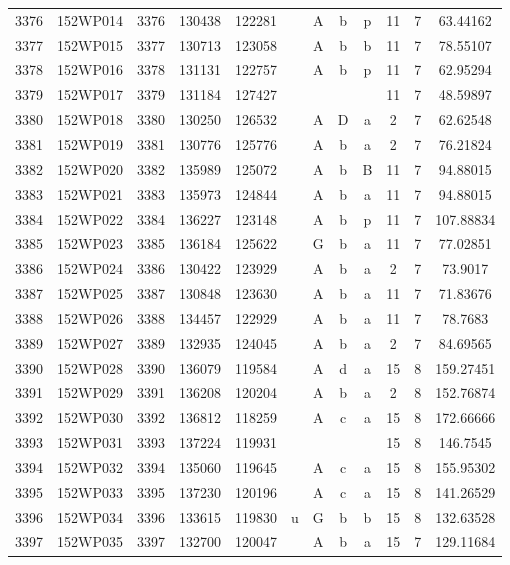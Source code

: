 \begin{tabular}{|*{12}{c|}}
3376 & 152WP014 & 3376 & 130438 & 122281 &  & A & b & p & 11 & 7 & 63.44162 \\ 
3377 & 152WP015 & 3377 & 130713 & 123058 &  & A & b & b & 11 & 7 & 78.55107 \\ 
3378 & 152WP016 & 3378 & 131131 & 122757 &  & A & b & p & 11 & 7 & 62.95294 \\ 
3379 & 152WP017 & 3379 & 131184 & 127427 &  &  &  &  & 11 & 7 & 48.59897 \\ 
3380 & 152WP018 & 3380 & 130250 & 126532 &  & A & D & a & 2 & 7 & 62.62548 \\ 
3381 & 152WP019 & 3381 & 130776 & 125776 &  & A & b & a & 2 & 7 & 76.21824 \\ 
3382 & 152WP020 & 3382 & 135989 & 125072 &  & A & b & B & 11 & 7 & 94.88015 \\ 
3383 & 152WP021 & 3383 & 135973 & 124844 &  & A & b & a & 11 & 7 & 94.88015 \\ 
3384 & 152WP022 & 3384 & 136227 & 123148 &  & A & b & p & 11 & 7 & 107.88834 \\ 
3385 & 152WP023 & 3385 & 136184 & 125622 &  & G & b & a & 11 & 7 & 77.02851 \\ 
3386 & 152WP024 & 3386 & 130422 & 123929 &  & A & b & a & 2 & 7 & 73.9017 \\ 
3387 & 152WP025 & 3387 & 130848 & 123630 &  & A & b & a & 11 & 7 & 71.83676 \\ 
3388 & 152WP026 & 3388 & 134457 & 122929 &  & A & b & a & 11 & 7 & 78.7683 \\ 
3389 & 152WP027 & 3389 & 132935 & 124045 &  & A & b & a & 2 & 7 & 84.69565 \\ 
3390 & 152WP028 & 3390 & 136079 & 119584 &  & A & d & a & 15 & 8 & 159.27451 \\ 
3391 & 152WP029 & 3391 & 136208 & 120204 &  & A & b & a & 2 & 8 & 152.76874 \\ 
3392 & 152WP030 & 3392 & 136812 & 118259 &  & A & c & a & 15 & 8 & 172.66666 \\ 
3393 & 152WP031 & 3393 & 137224 & 119931 &  &  &  &  & 15 & 8 & 146.7545 \\ 
3394 & 152WP032 & 3394 & 135060 & 119645 &  & A & c & a & 15 & 8 & 155.95302 \\ 
3395 & 152WP033 & 3395 & 137230 & 120196 &  & A & c & a & 15 & 8 & 141.26529 \\ 
3396 & 152WP034 & 3396 & 133615 & 119830 & u & G & b & b & 15 & 8 & 132.63528 \\ 
3397 & 152WP035 & 3397 & 132700 & 120047 &  & A & b & a & 15 & 7 & 129.11684 \\ 

\end{tabular}
